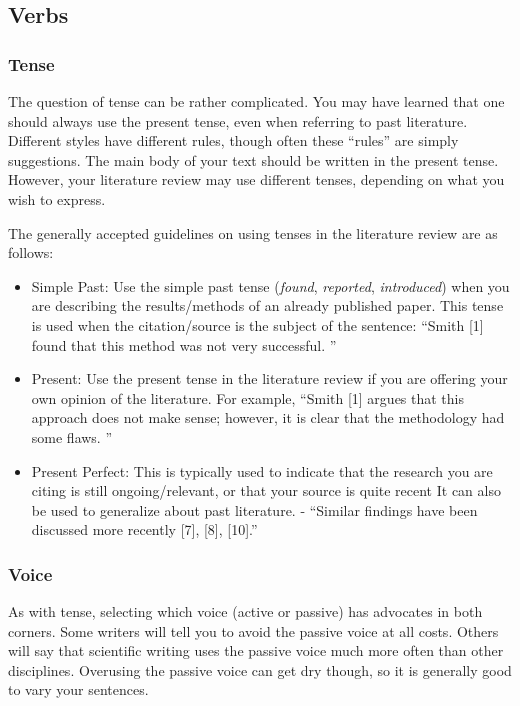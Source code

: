 \subsection{Verbs}
\subsubsection{Tense}
The question of tense can be rather complicated.
You may have learned that one should always use the present tense, even when referring to past literature.
Different styles have different rules, though often these ``rules'' are simply suggestions.
The main body of your text should be written in the present tense.
However, your literature review may use different tenses, depending on what you wish to express.

The generally accepted guidelines on using tenses in the literature review are as follows:
\begin{itemize}
	\item Simple Past: Use the simple past tense (\textit{found}, \textit{reported}, \textit{introduced}) when you are describing the results/methods of an already published paper.
	      This tense is used when the citation/source is the subject of the sentence: ``Smith [1] found that this method was not very successful.
	      ''
	\item Present: Use the present tense in the literature review if you are offering your own opinion of the literature.
	      For example, ``Smith [1] argues that this approach does not make sense; however, it is clear that the methodology had some flaws.
	      ''
	\item Present Perfect: This is typically used to indicate that the research you are citing is still ongoing/relevant, or that your source is quite recent It can also be used to generalize about past literature. - ``Similar findings have been discussed more recently [7], [8], [10].''
\end{itemize}

\subsubsection{Voice}
As with tense, selecting which voice (active or passive) has advocates in both corners.
Some writers will tell you to avoid the passive voice at all costs.
Others will say that scientific writing uses the passive voice much more often than other disciplines.
Overusing the passive voice can get dry though, so it is generally good to vary your sentences.

